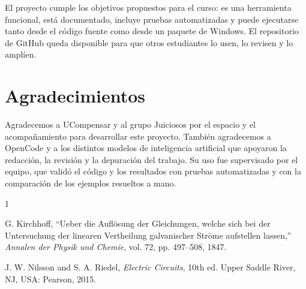 \documentclass[journal]{IEEEtran}
\begin{document}
El proyecto cumple los objetivos propuestos para el curso: es una herramienta funcional, está documentado, incluye pruebas automatizadas y puede ejecutarse tanto desde el código fuente como desde un paquete de Windows. El repositorio de GitHub queda disponible para que otros estudiantes lo usen, lo revisen y lo amplíen.

\section*{Agradecimientos}

Agradecemos a UCompensar y al grupo Juiciosos por el espacio y el acompañamiento para desarrollar este proyecto. También agradecemos a OpenCode y a los distintos modelos de inteligencia artificial que apoyaron la redacción, la revisión y la depuración del trabajo. Su uso fue supervisado por el equipo, que validó el código y los resultados con pruebas automatizadas y con la comparación de los ejemplos resueltos a mano.

\begin{thebibliography}{1}

G. Kirchhoff, ``Ueber die Aufl\"osung der Gleichungen, welche sich bei der Untersuchung der linearen Vertheilung galvanischer Str\"ome aufstellen lassen,'' \emph{Annalen der Physik und Chemie}, vol. 72, pp. 497--508, 1847.

J. W. Nilsson and S. A. Riedel, \emph{Electric Circuits}, 10th ed. Upper Saddle River, NJ, USA: Pearson, 2015.

\end{thebibliography}
\end{document}
